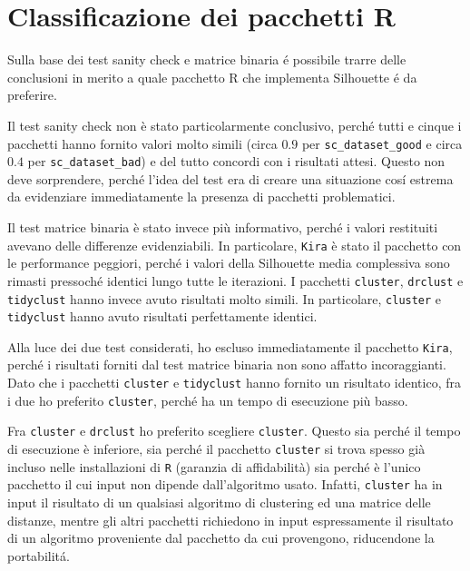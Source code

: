 \documentclass[a4paper, 12pt]{report}
\begin{document}
		\section{Classificazione dei pacchetti R}

			Sulla base dei test sanity check e matrice binaria é possibile
			trarre delle conclusioni in merito a quale pacchetto R che
			implementa Silhouette é da preferire.

			Il test sanity check non è stato particolarmente conclusivo,
			perché tutti e cinque i pacchetti hanno fornito valori molto
			simili (circa $0.9$ per \texttt{sc\_dataset\_good} e circa
			$0.4$ per \texttt{sc\_dataset\_bad}) e del tutto concordi con
			i risultati attesi. Questo non deve sorprendere, perché l'idea
			del test era di creare una situazione cosí estrema da evidenziare
			immediatamente la presenza di pacchetti problematici.

			Il test matrice binaria è stato invece più informativo, perché
			i valori restituiti avevano delle differenze evidenziabili. In
			particolare, \texttt{Kira} è stato il pacchetto con le performance
			peggiori, perché i valori della Silhouette media complessiva sono
			rimasti pressoché identici lungo tutte le iterazioni. I pacchetti
			\texttt{cluster}, \texttt{drclust} e \texttt{tidyclust} hanno
			invece avuto risultati molto simili. In particolare,
			\texttt{cluster} e \texttt{tidyclust} hanno avuto risultati
			perfettamente identici.

			Alla luce dei due test considerati, ho escluso immediatamente
			il pacchetto \texttt{Kira}, perché i risultati forniti dal test
			matrice binaria non sono affatto incoraggianti. Dato che i
			pacchetti \texttt{cluster} e \texttt{tidyclust} hanno fornito
			un risultato identico, fra i due ho preferito \texttt{cluster},
			perché ha un tempo di esecuzione più basso.

			Fra \texttt{cluster} e \texttt{drclust} ho preferito scegliere
			\texttt{cluster}. Questo sia perché il tempo di esecuzione è
			inferiore, sia perché il pacchetto \texttt{cluster} si trova
			spesso già incluso nelle installazioni di \texttt{R} (garanzia
			di affidabilità) sia perché è l'unico pacchetto il cui input
			non dipende dall'algoritmo usato. Infatti, \texttt{cluster}
			ha in input il risultato di un qualsiasi algoritmo di clustering
			ed una matrice delle distanze, mentre gli altri pacchetti
			richiedono in input espressamente il risultato di un algoritmo
			proveniente dal pacchetto da cui provengono, riducendone la
			portabilitá.
\end{document}
